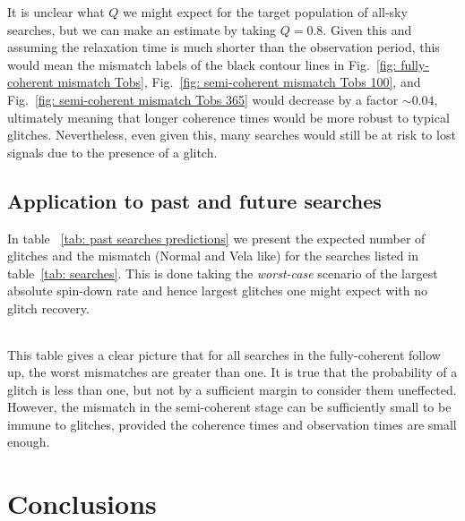 \documentclass[../full_thesis/full_thesis.tex]{subfiles}
\newcommand{\thisdir}{../glitches_in_CGW}
\begin{document}
It is unclear what $Q$ we might expect for the target population of all-sky
searches, but we can make an estimate by taking $Q=0.8$. Given this and
assuming the relaxation time is much shorter than the observation period, this
would mean the mismatch labels of the black contour lines in Fig.~\ref{fig:
fully-coherent mismatch Tobs}, Fig.~\ref{fig: semi-coherent mismatch Tobs 100},
and Fig.~\ref{fig: semi-coherent mismatch Tobs 365} would decrease by a factor
$\sim0.04$, ultimately meaning that longer coherence times would be more robust
to typical glitches. Nevertheless, even given this, many searches would still
be at risk to lost signals due to the presence of a glitch.

\subsection{Application to past and future searches}
In table ~\ref{tab: past searches predictions} we present the expected number
of glitches and the mismatch (Normal and Vela like) for the searches listed in
table~\ref{tab: searches}. This is done taking the \emph{worst-case} scenario
of the largest absolute spin-down rate and hence largest glitches one might
expect with no glitch recovery.
\begin{table*}
\centering
\caption{Predictions for the expected number of glitches and mismatch at the
         largest spin-down rates for the searches listed in
         table~\ref{tab: searches}. We present results both for the initial
         semi-coherent search mismatch and then for the mismatch in a fully-coherent
         search over the full observation time; note that the supernova
         remnants search was a fully-coherent search only and we give only the
         estimate for Cas A}
\label{tab: past searches predictions}
\begin{tabular}{l|l|l|l|l|l|l}

\end{tabular}
\end{table*}
This table gives a clear picture that for all searches in the fully-coherent
follow up, the worst mismatches are greater than one. It is true that the probability
of a glitch is less than one, but not by a sufficient margin to consider them
uneffected. However, the mismatch in the semi-coherent stage can be sufficiently
small to be immune to glitches, provided the coherence times and observation
times are small enough.

\section{Conclusions}
\label{sec: conclusion}
\end{document}

